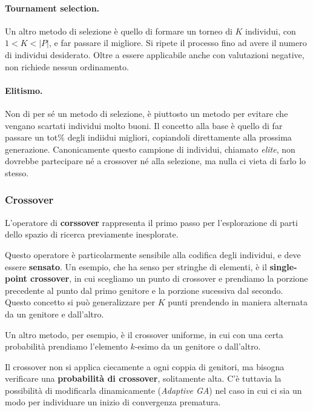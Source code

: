                 \paragraph{Tournament selection.} Un altro metodo di selezione è quello di formare un torneo di $K$ individui, con $1 < K < \vert P \vert$, e far passare il migliore. Si ripete il processo fino ad avere il numero di individui desiderato. Oltre a essere applicabile anche con valutazioni negative, non richiede nessun ordinamento.
                
                \paragraph{Elitismo.} Non di per sé un metodo di selezione, è piuttosto un metodo per evitare che vengano scartati individui molto buoni. Il concetto alla base è quello di far passare un tot$\%$ degli indiidui migliori, copiandoli direttamente alla prossima generazione. Canonicamente questo campione di individui, chiamato \textit{elite}, non dovrebbe partecipare né a crossover né alla selezione, ma nulla ci vieta di farlo lo stesso.
                
            \subsubsection{Crossover}
                L'operatore di \textbf{corssover} rappresenta il primo passo per l'esplorazione di parti dello spazio di ricerca previamente inesplorate.
                
                Questo operatore è particolarmente sensibile alla codifica degli individui, e deve essere \textbf{sensato}. Un esempio, che ha senso per stringhe di elementi, è il \textbf{single-point crossover}, in cui scegliamo un punto di crossover e prendiamo la porzione precedente al punto dal primo genitore e la porzione sucessiva dal secondo. Questo concetto si può generalizzare per $K$ punti prendendo in maniera alternata da un genitore e dall'altro.
                
                Un altro metodo, per esempio, è il crossover uniforme, in cui con una certa probabilità prendiamo l'elemento $k$-esimo da un genitore o dall'altro.
                
                Il crossover non si applica ciecamente a ogni coppia di genitori, ma bisogna verificare una \textbf{probabilità di crossover}, solitamente alta. C'è tuttavia la possibilità di modificarla dinamicamente (\textit{Adaptive GA}) nel caso in cui ci sia un modo per individuare un inizio di convergenza prematura.
                

